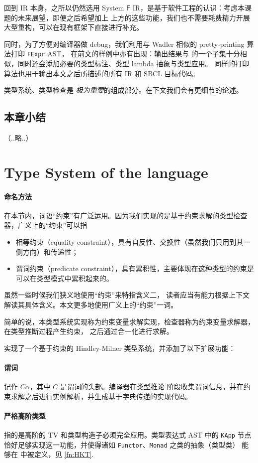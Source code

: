 \documentclass[a4paper, 11pt]{article}
\theoremstyle{remark}\newtheorem*{remark}{Remark}
\theoremstyle{definition}\newtheorem*{definition}{Definition}
\begin{document}
回到 IR 本身，之所以仍然选用 System $\mathsf{F}$ IR，是基于软件工程的认识：考虑本课题的未来展望，即便之后希望加上
上方的这些功能，我们也不需要耗费精力开展大型重构，可以在现有框架下直接进行补充。

同时，为了方便对编译器做 debug，我们利用与 Wadler 相似的 pretty-printing 算法打印 \texttt{FExpr} AST，
在前文的样例中亦有出现：输出结果与 \Tigris 的一个子集十分相似，同时还会添加必要的类型标注、类型 lambda 抽象与类型应用。
同样的打印算法也用于输出本文之后所描述的所有 IR 和 SBCL 目标代码。

类型系统、类型检查是 \Tigris \emph{极为重要}的组成部分。在下文我们会有更细节的论述。
\subsection{本章小结}（..略..）
\section{Type System of the \Tigris language}

\paragraph{命名方法} 在本节内，词语“约束”有广泛运用。因为我们实现的是基于约束求解的类型检查器，广义上的“约束”可以指
\begin{itemize}\itemsep0em
  \item 相等约束（equality constraint），具有自反性、交换性（虽然我们只用到其一侧方向）和传递性；
  \item 谓词约束（predicate constraint），具有累积性，主要体现在这种类型的约束是可以在类型模式中累积起来的。
\end{itemize}
虽然一些时候我们狭义地使用“约束”来特指含义二，
读者应当有能力根据上下文解读其具体含义。本文更多地使用广义上的“约束”一词。

简单的说，本类型系统实现称为约束变量求解实现，检查器称为约束变量求解器，在类型推断过程产生约束，
之后通过合一化进行求解。

\Tigris 实现了一个基于约束的 Hindley-Milner 类型系统，并添加了以下扩展功能：
\paragraph{谓词} 记作 \(C \bar{\alpha}\)，其中 $C$ 是谓词的头部。编译器在类型推论
阶段收集谓词信息，并在约束求解之后进行实例解析，并生成基于字典传递的实现代码。
\paragraph{严格高阶类型} 指的是高阶的 TV 和类型构造子必须完全应用。类型表达式 AST 中的
\texttt{KApp} 节点恰好足够实现这一功能，并使得诸如 \texttt{Functor}、\texttt{Monad} 之类的抽象（类型类）
能够在 \Tigris 中被定义，见 \autoref{fn:HKT}.
\end{document}
